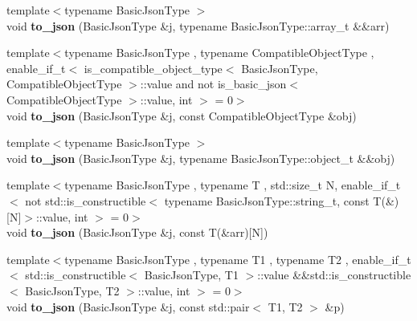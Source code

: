 \begin{DoxyCompactItemize}
\item 
\mbox{\label{namespacenlohmann_1_1detail_aa0fd1b5788e9ba37e31da43dda738cb5}} 
{\footnotesize template$<$typename Basic\+Json\+Type $>$ }\\void {\bfseries to\+\_\+json} (Basic\+Json\+Type \&j, typename Basic\+Json\+Type\+::array\+\_\+t \&\&arr)
\item 
\mbox{\label{namespacenlohmann_1_1detail_a24c9c12f3839c94e09532f08de85e949}} 
{\footnotesize template$<$typename Basic\+Json\+Type , typename Compatible\+Object\+Type , enable\+\_\+if\+\_\+t$<$ is\+\_\+compatible\+\_\+object\+\_\+type$<$ Basic\+Json\+Type, Compatible\+Object\+Type $>$\+::value and not is\+\_\+basic\+\_\+json$<$ Compatible\+Object\+Type $>$\+::value, int $>$  = 0$>$ }\\void {\bfseries to\+\_\+json} (Basic\+Json\+Type \&j, const Compatible\+Object\+Type \&obj)
\item 
\mbox{\label{namespacenlohmann_1_1detail_ac9f7a5542851c61d93740148eaec509f}} 
{\footnotesize template$<$typename Basic\+Json\+Type $>$ }\\void {\bfseries to\+\_\+json} (Basic\+Json\+Type \&j, typename Basic\+Json\+Type\+::object\+\_\+t \&\&obj)
\item 
\mbox{\label{namespacenlohmann_1_1detail_a20ea5175c8999fc8b673e46b892f71f6}} 
{\footnotesize template$<$typename Basic\+Json\+Type , typename T , std\+::size\+\_\+t N, enable\+\_\+if\+\_\+t$<$ not std\+::is\+\_\+constructible$<$ typename Basic\+Json\+Type\+::string\+\_\+t, const T(\&)\mbox{[}\+N\mbox{]}$>$\+::value, int $>$  = 0$>$ }\\void {\bfseries to\+\_\+json} (Basic\+Json\+Type \&j, const T(\&arr)\mbox{[}N\mbox{]})
\item 
\mbox{\label{namespacenlohmann_1_1detail_ab64eeb55b44db44eb8e9070229eb97df}} 
{\footnotesize template$<$typename Basic\+Json\+Type , typename T1 , typename T2 , enable\+\_\+if\+\_\+t$<$ std\+::is\+\_\+constructible$<$ Basic\+Json\+Type, T1 $>$\+::value \&\&std\+::is\+\_\+constructible$<$ Basic\+Json\+Type, T2 $>$\+::value, int $>$  = 0$>$ }\\void {\bfseries to\+\_\+json} (Basic\+Json\+Type \&j, const std\+::pair$<$ T1, T2 $>$ \&p)

\end{DoxyCompactItemize}
